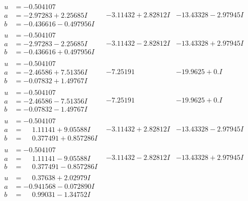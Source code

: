 \documentclass[1p]{elsarticle_modified}
\theoremstyle{definition}
\begin{document}
$$\begin{array}{c|c|c}
\begin{aligned}
u &= -0.504107\phantom{ +0.000000I} \\
a &= -2.97283 + 2.25685 I \\
b &= -0.436616 - 0.497956 I\end{aligned}
 & -3.11432 + 2.82812 I & -13.43328 - 2.97945 I \\ \hline\begin{aligned}
u &= -0.504107\phantom{ +0.000000I} \\
a &= -2.97283 - 2.25685 I \\
b &= -0.436616 + 0.497956 I\end{aligned}
 & -3.11432 - 2.82812 I & -13.43328 + 2.97945 I \\ \hline\begin{aligned}
u &= -0.504107\phantom{ +0.000000I} \\
a &= -2.46586 + 7.51356 I \\
b &= -0.07832 + 1.49767 I\end{aligned}
 & -7.25191\phantom{ +0.000000I} & -19.9625 + 0. I\phantom{ +0.000000I} \\ \hline\begin{aligned}
u &= -0.504107\phantom{ +0.000000I} \\
a &= -2.46586 - 7.51356 I \\
b &= -0.07832 - 1.49767 I\end{aligned}
 & -7.25191\phantom{ +0.000000I} & -19.9625 + 0. I\phantom{ +0.000000I} \\ \hline\begin{aligned}
u &= -0.504107\phantom{ +0.000000I} \\
a &= \phantom{-}1.11141 + 9.05588 I \\
b &= \phantom{-}0.377491 + 0.857286 I\end{aligned}
 & -3.11432 + 2.82812 I & -13.43328 - 2.97945 I \\ \hline\begin{aligned}
u &= -0.504107\phantom{ +0.000000I} \\
a &= \phantom{-}1.11141 - 9.05588 I \\
b &= \phantom{-}0.377491 - 0.857286 I\end{aligned}
 & -3.11432 - 2.82812 I & -13.43328 + 2.97945 I \\ \hline\begin{aligned}
u &= \phantom{-}0.37638 + 2.02979 I \\
a &= -0.941568 - 0.072890 I \\
b &= \phantom{-}0.99031 - 1.34752 I\end{aligned}

\end{array}$$
\end{document}
